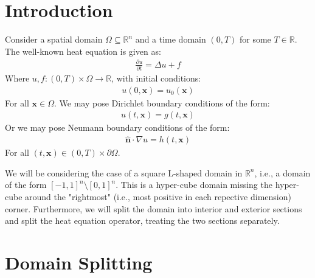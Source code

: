 \documentclass{article}
\newcommand{\bvec}[1]{\boldsymbol{#1}}
\newcommand{\brvec}[1]{\mathbf{#1}}
\begin{document}
\section{Introduction}

Consider a spatial domain $\Omega \subseteq \mathbb{R}^n$
and a time domain $(0, T)$ for some $T \in \mathbb{R}$.
The well-known heat equation is given as:
\begin{align*}
    \frac{\partial u}{\partial t} = \Delta u + f
\end{align*}
\noindent Where $u, f : (0, T) \times \Omega \rightarrow \mathbb{R}$,
with initial conditions:
\begin{align*}
    u(0, \bvec{x}) = u_0(\bvec{x})
\end{align*}
\noindent For all $\bvec{x} \in \Omega$.
We may pose Dirichlet boundary conditions of the form:
\begin{align*}
    u(t, \bvec{x}) = g(t, \bvec{x})
\end{align*}
\noindent Or we may pose Neumann boundary conditions of the form:
\begin{align*}
    \hat{\brvec{n}} \cdot \nabla u = h(t, \bvec{x})
\end{align*}
\noindent For all $(t, \bvec{x}) \in (0, T) \times \partial \Omega$.

We will be considering the case of a square L-shaped domain in $\mathbb{R}^n$,
i.e., a domain of the form $[-1, 1]^n \setminus [0, 1]^n$.
This is a hyper-cube domain missing the hyper-cube around the "rightmost"
(i.e., most positive in each repective dimension) corner.
Furthermore, we will split the domain into interior and exterior sections
and split the heat equation operator, treating the two sections separately.

\newpage
\section{Domain Splitting}
\end{document}
